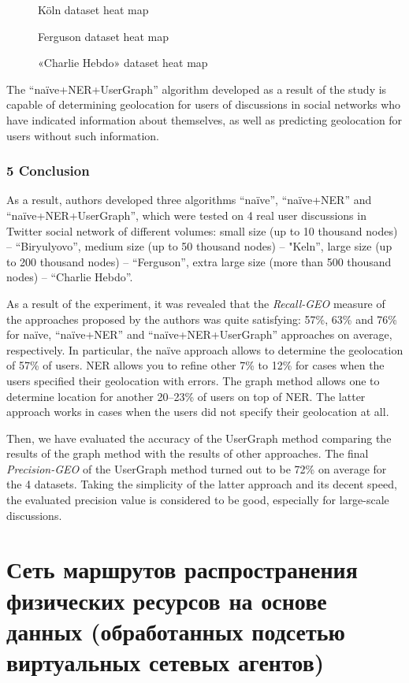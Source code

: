 \begin{figure}[ht]
	\caption{Köln dataset heat map}\label{fig:kolnDatasetHeatMap}
\end{figure}

\begin{figure}[ht]
	\caption{Ferguson dataset heat map}\label{fig:fergusonDatasetHeatMap}
\end{figure}

\begin{figure}[ht]
	\caption{«Charlie Hebdo» dataset heat map}\label{fig:chDatasetHeatMap}
\end{figure}

The “naïve+NER+UserGraph” algorithm developed as a result of the study is capable of determining geolocation for users of discussions in social networks who have indicated information about themselves, as well as predicting geolocation for users without such information.

\subsubsection{5 Conclusion}

As a result, authors developed three algorithms “naïve”, “naïve+NER” and “naïve+NER+UserGraph”, which were tested on 4 real user discussions in Twitter social network of different volumes: small size (up to 10 thousand nodes) -- “Biryulyovo”, medium size (up to 50 thousand nodes) -- "Keln”, large size (up to 200 thousand nodes) -- “Ferguson”, extra large size (more than 500 thousand nodes) -- “Charlie Hebdo”.

As a result of the experiment, it was revealed that the \textit{Recall-GEO} measure of the approaches proposed by the authors was quite satisfying: 57\%, 63\% and 76\% for naïve, “naïve+NER” and “naïve+NER+UserGraph” approaches on average, respectively. In particular, the naïve approach allows to determine the geolocation of 57\% of users. NER allows you to refine other 7\% to 12\% for cases when the users specified their geolocation with errors. The graph method allows one to determine location for another 20--23\% of users on top of NER. The latter approach works in cases when the users did not specify their geolocation at all.

Then, we have evaluated the accuracy of the UserGraph method comparing the results of the graph method with the results of other approaches. The final \textit{Precision-GEO} of the UserGraph method turned out to be 72\% on average for the 4 datasets. Taking the simplicity of the latter approach and its decent speed, the evaluated precision value is considered to be good, especially for large-scale discussions.

\section{Сеть маршрутов распространения физических ресурсов на основе данных (обработанных подсетью виртуальных сетевых агентов)}\label{sec:ch6/sect4}

\FloatBarrier

